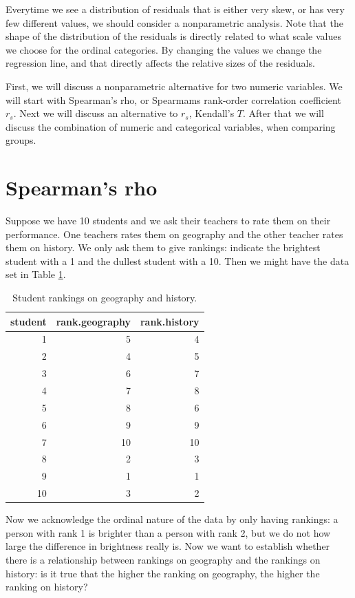\documentclass[]{book}\usepackage[]{graphicx}\usepackage[]{color}
\begin{document}
Everytime we see a distribution of residuals that is either very skew, or has very few different values, we should consider a nonparametric analysis. Note that the shape of the distribution of the residuals is directly related to what scale values we choose for the ordinal categories. By changing the values we change the regression line, and that directly affects the relative sizes of the residuals. 

First, we will discuss a nonparametric alternative for two numeric variables. We will start with Spearman's rho, or Spearmams rank-order correlation coefficient $r_s$. Next we will discuss an alternative to $r_s$, Kendall's $T$. After that we will discuss the combination of numeric and categorical variables, when comparing groups.

\section{Spearman's rho}

Suppose we have 10 students and we ask their teachers to rate them on their performance. One teachers rates them on geography and the other teacher rates them on history. We only ask them to give rankings: indicate the brightest student with a 1 and the dullest student with a 10. Then we might have the data set in Table \ref{tab:nonpar_3}.

\begin{table}[ht]
\centering
\caption{Student rankings on geography and history.} 
\label{tab:nonpar_3}
\begin{tabular}{rrr}
  \hline
student & rank.geography & rank.history \\ 
  \hline
1 & 5 & 4 \\ 
  2 & 4 & 5 \\ 
  3 & 6 & 7 \\ 
  4 & 7 & 8 \\ 
  5 & 8 & 6 \\ 
  6 & 9 & 9 \\ 
  7 & 10 & 10 \\ 
  8 & 2 & 3 \\ 
  9 & 1 & 1 \\ 
  10 & 3 & 2 \\ 
   \hline
\end{tabular}
\end{table}


Now we acknowledge the ordinal nature of the data by only having rankings: a person with rank 1 is brighter than a person with rank 2, but we do not how large the difference in brightness really is. Now we want to establish whether there is a relationship between rankings on geography and the rankings on history: is it true that the higher the ranking on geography, the higher the ranking on history?
\end{document}
